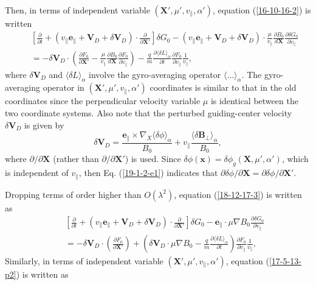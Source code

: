 \documentclass{llncs}
\begin{document}
Then, in terms of independent variable $(\mathbf{X}', \mu', v_{\parallel},
\alpha')$, equation (\ref{16-10-16-2}) is written
\begin{eqnarray}
  &  & \left[ \frac{\partial}{\partial t} + (v_{\parallel}
  \mathbf{e}_{\parallel} +\mathbf{V}_D + \delta \mathbf{V}_D) \cdot
  \frac{\partial}{\partial \mathbf{X}'} \right] \delta G_0 - (v_{\parallel}
  \mathbf{e}_{\parallel} +\mathbf{V}_D + \delta \mathbf{V}_D) \cdot
  \frac{\mu}{v_{\parallel}}  \frac{\partial B_0}{d\mathbf{X}} \frac{\partial
  \delta G_0}{\partial v_{\parallel}} \nonumber\\
  &  & = - \delta \mathbf{V}_D \cdot \left( \frac{\partial F_0}{\partial
  \mathbf{X}'} - \frac{\mu}{v_{\parallel}}  \frac{\partial B_0}{d\mathbf{X}}
  \frac{\partial F_0}{\partial v_{\parallel}} \right) - \frac{q}{m} 
  \frac{\partial \langle \delta L \rangle_{\alpha}}{\partial t} 
  \frac{\partial F_0}{\partial v_{\parallel}}  \frac{1}{v_{\parallel}}, 
  \label{18-12-17-3}
\end{eqnarray}
where $\delta \mathbf{V}_D$ and $\langle \delta L \rangle_{\alpha}$ involve
the gyro-averaging operator $\langle \ldots \rangle_{\alpha}$. The
gyro-averaging operator in $(\mathbf{X}', \mu', v_{\parallel}, \alpha')$
coordinates is similar to that in the old coordinates since the perpendicular
velocity variable $\mu$ is identical between the two coordinate systems. Also
note that the perturbed guiding-center velocity $\delta \mathbf{V}_D$ is given
by
\begin{equation}
  \delta \mathbf{V}_D = \frac{\mathbf{e}_{\parallel} \times \nabla_X \langle
  \delta \phi \rangle_{\alpha}}{B_0} + v_{\parallel} \frac{\langle \delta
  \mathbf{B}_{\perp} \rangle_{\alpha}}{B_0},
\end{equation}
where $\partial / \partial \mathbf{X}$ (rather than $\partial / \partial
\mathbf{X}'$) is used. Since $\delta \phi (\mathbf{x}) = \delta \phi_g
(\mathbf{X}, \mu', \alpha')$, which is independent of $v_{\parallel}$, then
Eq. (\ref{19-1-2-e1}) indicates that $\partial \delta \phi / \partial
\mathbf{X}= \partial \delta \phi / \partial \mathbf{X}'$.

Dropping terms of order higher than $O (\lambda^2)$, equation
(\ref{18-12-17-3}) is written as
\begin{eqnarray}
  &  & \left[ \frac{\partial}{\partial t} + (v_{\parallel}
  \mathbf{e}_{\parallel} +\mathbf{V}_D + \delta \mathbf{V}_D) \cdot
  \frac{\partial}{\partial \mathbf{X}'} \right] \delta G_0
  -\mathbf{e}_{\parallel} \cdot \mu \nabla B_0 \frac{\partial \delta
  G_0}{\partial v_{\parallel}} \nonumber\\
  &  & = - \delta \mathbf{V}_D \cdot \left( \frac{\partial F_0}{\partial
  \mathbf{X}'} \right) + \left( \delta \mathbf{V}_D \cdot \mu \nabla B_0 -
  \frac{q}{m}  \frac{\partial \langle \delta L \rangle_{\alpha}}{\partial t}
  \right)  \frac{\partial F_0}{\partial v_{\parallel}} 
  \frac{1}{v_{\parallel}}, 
\end{eqnarray}
Similarly, in terms of independent variable $(\mathbf{X}', \mu',
v_{\parallel}, \alpha')$, equation (\ref{17-5-13-p2}) is written as
\end{document}
